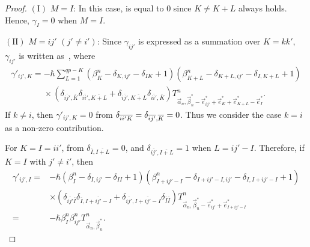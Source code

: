 \documentclass[pdftex]{sigma}
\numberwithin{equation}{section}
\begin{document}
\begin{proof}
$(\textrm{I})$ $M=I$: In this case,
is equal to 0 since
$
 K
 \neq
 K+L
$
always holds. Hence, $\gamma_{I}=0$ when $M=I$.


 $(\textrm{II})$
 $M=ij'$
 $(
 j'
 \neq
 i'
 )$:
Since $\gamma_{ij'}$ is expressed as a summation over $K=kk'$,
$\gamma_{ij'}$ is written as~,
where
\begin{gather}
 \gamma'_{ij',K}
 =
 -
 \hbar
 \sum_{L=1}^{qp-K}
 (
 \beta_{K}^{n}
 -
 \delta_{K,ij'}
 -
 \delta_{IK}
 +
 1
 )
 (
 \beta_{K+L}^{n}
 -
 \delta_{K+L,ij'}
 -
 \delta_{I,K+L}
 +
 1
 )
 \nonumber
 \\
\phantom{ \gamma'_{ij',K}
 =}{}
 \times
 (
 \delta_{
 \overline{ij'},
 \overline{K}
 }
 \delta_{
 \overline{ii'},
 \overline{K+L}
 }
 +
 \delta_{
 \overline{ij'},
 \overline{K+L}
 }
 \delta_{
 \overline{ii'},
 \overline{K}
 }
 )
 T^{n}_{\vec{\alpha}_{n},\vec{\beta}_{n}^{\ast}-\vec{e}_{ij'}^{\ast}+\vec{e}_{K}^{\ast}+\vec{e}_{K+L}^{\ast}-\vec{e}_{I}^{\ast}}.
\label{gamma_ij}
\end{gather}
If
$
 k
 \neq
 i
$,
then $\gamma'_{ij',K}=0$
from
$
 \delta_{
 \overline{ii'}
 \overline{K}
 }
 =
 \delta_{
 \overline{ij'},
 \overline{K}
 }
 =
 0
$.
Thus we consider the case
$
 k
 =
 i
$
as a non-zero contribution.



For
$
 K
 =
 I
 =
 ii'
$,
from
$
 \delta_{
 \overline{I},
 \overline{I+L}
 }
 =
 0
$,
and
$
 \delta_{
 \overline{ij'},
 \overline{I+L}
 }
 =
 1
$
when
$
L
=
ij'
-
I
$.
Therefore, if $K=I$ with
$
j'
\neq
i'
$,
then
\begin{align*}
 \gamma'_{ij',I}
={}&
 -
 \hbar
 (
 \beta_{I}^{n}
 -
 \delta_{I,ij'}
 -
 \delta_{II}
 +
 1
 )
 (
 \beta_{I+ij'-I}^{n}
 -
 \delta_{I+ij'-I,ij'}
 -
 \delta_{I,I+ij'-I}
 +
 1
 )
 \nonumber
 \\
 &
 \times
 (
 \delta_{
 \overline{ij'}
 \overline{I}
 }
 \delta_{
 \overline{I},
 \overline{I+ij'-I}
 }
 +
 \delta_{
 \overline{ij'},
 \overline{I+ij'-I}
 }
 \delta_{
 \overline{I}
 \overline{I}
 }
 )
 T^{n}_{\vec{\alpha}_{n},\vec{\beta}_{n}^{\ast}-\vec{e}_{ij'}^{\ast}+\vec{e}_{I+ij'-I}^{\ast}}
 \\
={}&
 -
 \hbar
 \beta_{I}^{n}
 \beta_{ij'}^{n}
 T^{n}_{\vec{\alpha}_{n},\vec{\beta}_{n}^{\ast}}
 .
\end{align*}



\end{proof}
\end{document}
